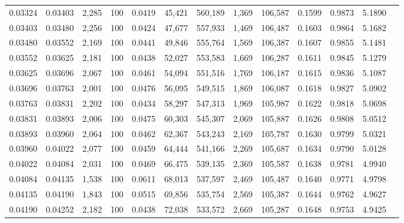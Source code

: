 \begin{tabular}{rrrrrrrrrrrrr}
0.03324 & 0.03403 & 2,285 & 100 &                                     0.0419 &  45,421 & 560,189 &   1,369 & 106,587 & 0.1599 & 0.9873 & 5.1890 \\
0.03403 & 0.03480 & 2,256 & 100 &                                     0.0424 &  47,677 & 557,933 &   1,469 & 106,487 & 0.1603 & 0.9864 & 5.1682 \\
0.03480 & 0.03552 & 2,169 & 100 &                                     0.0441 &  49,846 & 555,764 &   1,569 & 106,387 & 0.1607 & 0.9855 & 5.1481 \\
0.03552 & 0.03625 & 2,181 & 100 &                                     0.0438 &  52,027 & 553,583 &   1,669 & 106,287 & 0.1611 & 0.9845 & 5.1279 \\
0.03625 & 0.03696 & 2,067 & 100 &                                     0.0461 &  54,094 & 551,516 &   1,769 & 106,187 & 0.1615 & 0.9836 & 5.1087 \\
0.03696 & 0.03763 & 2,001 & 100 &                                     0.0476 &  56,095 & 549,515 &   1,869 & 106,087 & 0.1618 & 0.9827 & 5.0902 \\
0.03763 & 0.03831 & 2,202 & 100 &                                     0.0434 &  58,297 & 547,313 &   1,969 & 105,987 & 0.1622 & 0.9818 & 5.0698 \\
0.03831 & 0.03893 & 2,006 & 100 &                                     0.0475 &  60,303 & 545,307 &   2,069 & 105,887 & 0.1626 & 0.9808 & 5.0512 \\
0.03893 & 0.03960 & 2,064 & 100 &                                     0.0462 &  62,367 & 543,243 &   2,169 & 105,787 & 0.1630 & 0.9799 & 5.0321 \\
0.03960 & 0.04022 & 2,077 & 100 &                                     0.0459 &  64,444 & 541,166 &   2,269 & 105,687 & 0.1634 & 0.9790 & 5.0128 \\
0.04022 & 0.04084 & 2,031 & 100 &                                     0.0469 &  66,475 & 539,135 &   2,369 & 105,587 & 0.1638 & 0.9781 & 4.9940 \\
0.04084 & 0.04135 & 1,538 & 100 &                                     0.0611 &  68,013 & 537,597 &   2,469 & 105,487 & 0.1640 & 0.9771 & 4.9798 \\
0.04135 & 0.04190 & 1,843 & 100 &                                     0.0515 &  69,856 & 535,754 &   2,569 & 105,387 & 0.1644 & 0.9762 & 4.9627 \\
0.04190 & 0.04252 & 2,182 & 100 &                                     0.0438 &  72,038 & 533,572 &   2,669 & 105,287 & 0.1648 & 0.9753 & 4.9425 \\

\end{tabular}
